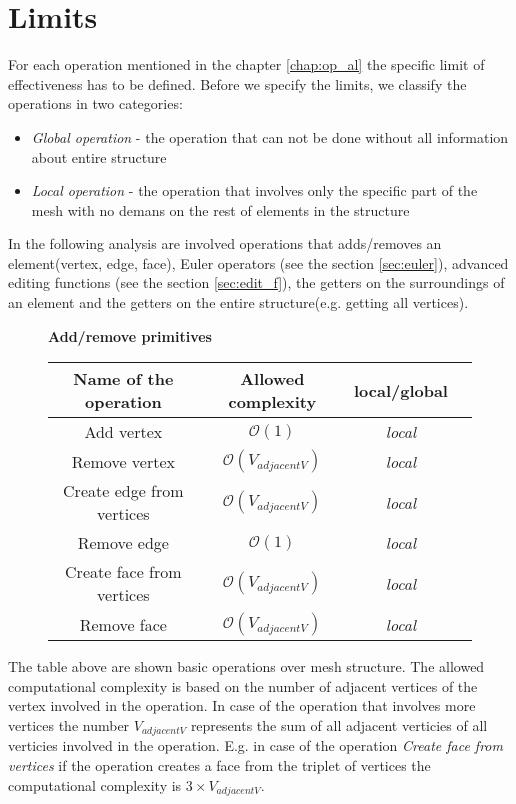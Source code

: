 \section{Limits}

For each operation mentioned in the chapter \ref{chap:op_al} the specific limit of effectiveness has to be defined. Before we specify the limits, we classify the operations in two categories:

\begin{itemize}
\item \emph{Global operation} - the operation that can not be done without all information
about entire structure
\item \emph{Local operation} - the operation that involves only the specific part of the mesh
with no demans on the rest of elements in the structure
\end{itemize}
In the following analysis are involved operations that adds/removes an element(vertex, edge, face),
Euler operators (see the section \ref{sec:euler}), advanced editing functions (see the
section \ref{sec:edit_f}),
the getters on the surroundings of an element and the getters
on the entire structure(e.g. getting all vertices).

\begin{figure}[!htbp]

\centering
\textbf{Add/remove primitives}\\
\label{fig:comp_prim}
\vspace{2mm}
\begin{tabular}{| c | c | c | c |}
\hline
\textbf{Name of the operation} & \textbf{Allowed complexity} & \textbf{local/global}\\
\hline
Add vertex & $\mathcal{O}(1)$ & \emph{local}\\
\hline
Remove vertex & $\mathcal{O}(V_{adjacentV})$ & \emph{local}\\
\hline
Create edge from vertices& $\mathcal{O}(V_{adjacentV})$ & \emph{local}\\
\hline
Remove edge & $\mathcal{O}(1)$ & \emph{local}\\
\hline
Create face from vertices& $\mathcal{O}(V_{adjacentV})$ & \emph{local}\\
\hline
Remove face & $\mathcal{O}(V_{adjacentV})$ & \emph{local}\\
\hline
\end{tabular}
\end{figure}

The table above are shown basic operations over mesh structure. The allowed
computational complexity is based on the number of adjacent vertices of the vertex involved
in the operation. In case of the operation that involves more vertices the number $V_{adjacentV}$
represents the sum of all adjacent verticies of all verticies involved in the operation.
E.g. in case of the operation \emph{Create face from vertices} if the operation creates a
face from the triplet of vertices the computational complexity is $3 \times V_{adjacentV}$.

